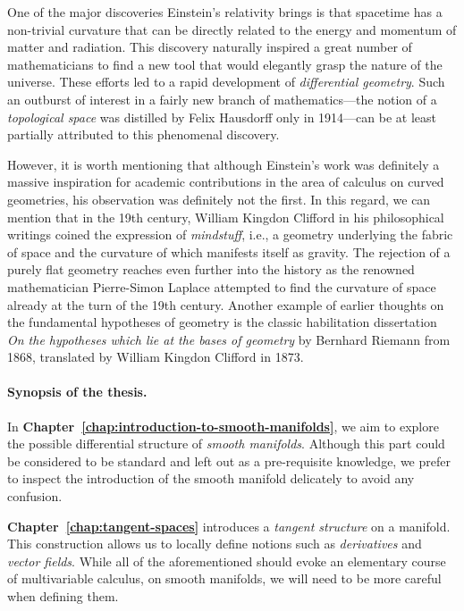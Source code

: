 \documentclass[11pt,a4paper,twoside,openany]{report}
\theoremstyle{my-theorem}
\theoremstyle{non-theorem}
\begin{document}
	One of the major discoveries Einstein's relativity brings is that spacetime has a non-trivial curvature that can be directly related to the energy and momentum of matter and radiation. This discovery naturally inspired a great number of mathematicians to find a new tool that would elegantly grasp the nature of the universe. These efforts led to a rapid development of \emph{differential geometry}. Such an outburst of interest in a fairly new branch of mathematics---the notion of a \emph{topological space} was distilled by Felix Hausdorff only in 1914---can be at least partially attributed to this phenomenal discovery.
	
	However, it is worth mentioning that although Einstein's work was definitely a massive inspiration for academic contributions in the area of calculus on curved geometries, his observation was definitely not the first. In this regard, we can mention that in the 19th century, William Kingdon Clifford in his philosophical writings coined the expression of \emph{mindstuff}, i.e., a geometry underlying the fabric of space and the curvature of which manifests itself as gravity. The rejection of a purely flat geometry reaches even further into the history as the renowned mathematician Pierre-Simon Laplace attempted to find the curvature of space already at the turn of the 19th century. Another example of earlier thoughts on the fundamental hypotheses of geometry is the classic habilitation dissertation \emph{On the hypotheses which lie at the bases of geometry} by Bernhard Riemann from 1868, translated by William Kingdon Clifford in 1873.
	
	\paragraph*{Synopsis of the thesis.} In \textbf{Chapter~\ref{chap:introduction-to-smooth-manifolds}}, we aim to explore the possible differential structure of \emph{smooth manifolds}. Although this part could be considered to be standard and left out as a pre-requisite knowledge, we prefer to inspect the introduction of the smooth manifold delicately to avoid any confusion.
	
	\textbf{Chapter~\ref{chap:tangent-spaces}} introduces a \emph{tangent structure} on a manifold. This construction allows us to locally define notions such as \emph{derivatives} and \emph{vector fields}. While all of the aforementioned should evoke an elementary course of multivariable calculus, on smooth manifolds, we will need to be more careful when defining them.
	
\end{document}
